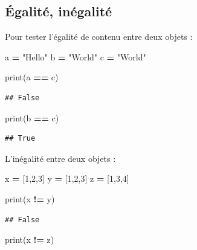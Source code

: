 \documentclass[
  12pt,
]{book}
\newenvironment{Shaded}{\begin{snugshade}}{\end{snugshade}}
\newcommand{\BuiltInTok}[1]{#1}
\newcommand{\DecValTok}[1]{\textcolor[rgb]{0.00,0.00,0.81}{#1}}
\newcommand{\NormalTok}[1]{#1}
\newcommand{\OperatorTok}[1]{\textcolor[rgb]{0.81,0.36,0.00}{\textbf{#1}}}
\newcommand{\StringTok}[1]{\textcolor[rgb]{0.31,0.60,0.02}{#1}}
\numberwithin{equation}{section}
\numberwithin{countremarque}{section}
\begin{document}
\subsection{Égalité, inégalité}\label{uxe9galituxe9-inuxe9galituxe9}

Pour tester l'égalité de contenu entre deux objets :

\begin{Shaded}
\begin{Highlighting}[]
\NormalTok{a }\OperatorTok{=} \StringTok{"Hello"}
\NormalTok{b }\OperatorTok{=} \StringTok{"World"}
\NormalTok{c }\OperatorTok{=} \StringTok{"World"}

\BuiltInTok{print}\NormalTok{(a }\OperatorTok{==}\NormalTok{ c)}
\end{Highlighting}
\end{Shaded}

\begin{lstlisting}
## False
\end{lstlisting}

\begin{Shaded}
\begin{Highlighting}[]
\BuiltInTok{print}\NormalTok{(b }\OperatorTok{==}\NormalTok{ c)}
\end{Highlighting}
\end{Shaded}

\begin{lstlisting}
## True
\end{lstlisting}

L'inégalité entre deux objets :

\begin{Shaded}
\begin{Highlighting}[]
\NormalTok{x }\OperatorTok{=}\NormalTok{ [}\DecValTok{1}\NormalTok{,}\DecValTok{2}\NormalTok{,}\DecValTok{3}\NormalTok{]}
\NormalTok{y }\OperatorTok{=}\NormalTok{ [}\DecValTok{1}\NormalTok{,}\DecValTok{2}\NormalTok{,}\DecValTok{3}\NormalTok{]}
\NormalTok{z }\OperatorTok{=}\NormalTok{ [}\DecValTok{1}\NormalTok{,}\DecValTok{3}\NormalTok{,}\DecValTok{4}\NormalTok{]}

\BuiltInTok{print}\NormalTok{(x }\OperatorTok{!=}\NormalTok{ y)}
\end{Highlighting}
\end{Shaded}

\begin{lstlisting}
## False
\end{lstlisting}

\begin{Shaded}
\begin{Highlighting}[]
\BuiltInTok{print}\NormalTok{(x }\OperatorTok{!=}\NormalTok{ z)}
\end{Highlighting}
\end{Shaded}
\end{document}
